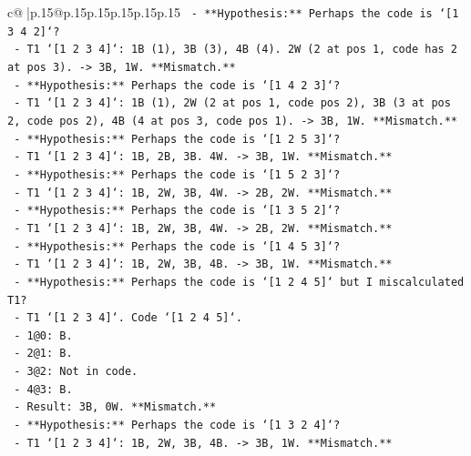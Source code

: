 \documentclass{article}
\begin{document}
{\begin{supertabular}{c@{$\;$}|p{.15\linewidth}@{}p{.15\linewidth}p{.15\linewidth}p{.15\linewidth}p{.15\linewidth}p{.15\linewidth}}
{{{\texttt{              {-} **Hypothesis:** Perhaps the code is `{[}1 3 4 2{]}`?} \\
\texttt{                {-} T1 `{[}1 2 3 4{]}`: 1B (1), 3B (3), 4B (4). 2W (2 at pos 1, code has 2 at pos 3). {-}> 3B, 1W. **Mismatch.**} \\
\texttt{              {-} **Hypothesis:** Perhaps the code is `{[}1 4 2 3{]}`?} \\
\texttt{                {-} T1 `{[}1 2 3 4{]}`: 1B (1), 2W (2 at pos 1, code pos 2), 3B (3 at pos 2, code pos 2), 4B (4 at pos 3, code pos 1). {-}> 3B, 1W. **Mismatch.**} \\
\texttt{              {-} **Hypothesis:** Perhaps the code is `{[}1 2 5 3{]}`?} \\
\texttt{                {-} T1 `{[}1 2 3 4{]}`: 1B, 2B, 3B. 4W. {-}> 3B, 1W. **Mismatch.**} \\
\texttt{              {-} **Hypothesis:** Perhaps the code is `{[}1 5 2 3{]}`?} \\
\texttt{                {-} T1 `{[}1 2 3 4{]}`: 1B, 2W, 3B, 4W. {-}> 2B, 2W. **Mismatch.**} \\
\texttt{              {-} **Hypothesis:** Perhaps the code is `{[}1 3 5 2{]}`?} \\
\texttt{                {-} T1 `{[}1 2 3 4{]}`: 1B, 2W, 3B, 4W. {-}> 2B, 2W. **Mismatch.**} \\
\texttt{              {-} **Hypothesis:** Perhaps the code is `{[}1 4 5 3{]}`?} \\
\texttt{                {-} T1 `{[}1 2 3 4{]}`: 1B, 2W, 3B, 4B. {-}> 3B, 1W. **Mismatch.**} \\
\texttt{              {-} **Hypothesis:** Perhaps the code is `{[}1 2 4 5{]}` but I miscalculated T1?} \\
\texttt{                {-} T1 `{[}1 2 3 4{]}`. Code `{[}1 2 4 5{]}`.} \\
\texttt{                {-} 1@0: B.} \\
\texttt{                {-} 2@1: B.} \\
\texttt{                {-} 3@2: Not in code.} \\
\texttt{                {-} 4@3: B.} \\
\texttt{                {-} Result: 3B, 0W. **Mismatch.**} \\
\texttt{              {-} **Hypothesis:** Perhaps the code is `{[}1 3 2 4{]}`?} \\
\texttt{                {-} T1 `{[}1 2 3 4{]}`: 1B, 2W, 3B, 4B. {-}> 3B, 1W. **Mismatch.**} \\
}}}
\end{supertabular}}
\end{document}
